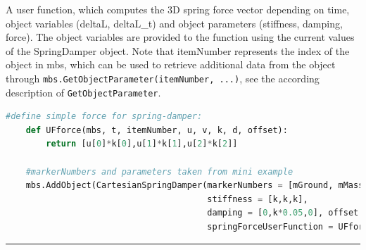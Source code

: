     A user function, which computes the 3D spring force vector depending on time, object variables (deltaL, deltaL\_t) and object parameters 
    (stiffness, damping, force).
    The object variables are provided to the function using the current values of the SpringDamper object.
    Note that itemNumber represents the index of the object in mbs, which can be used to retrieve additional data from the object through
    \texttt{mbs.GetObjectParameter(itemNumber, ...)}, see the according description of \texttt{GetObjectParameter}.
    \finishTable
    \userFunctionExample{}
    \pythonstyle
    \begin{lstlisting}[language=Python]
    #define simple force for spring-damper:
    def UFforce(mbs, t, itemNumber, u, v, k, d, offset): 
        return [u[0]*k[0],u[1]*k[1],u[2]*k[2]]
    
    #markerNumbers and parameters taken from mini example
    mbs.AddObject(CartesianSpringDamper(markerNumbers = [mGround, mMass], 
                                        stiffness = [k,k,k], 
                                        damping = [0,k*0.05,0], offset = [0,0,0],
                                        springForceUserFunction = UFforce))
    \end{lstlisting}
\vspace{6pt}\par\noindent\rule{\textwidth}{0.4pt}
